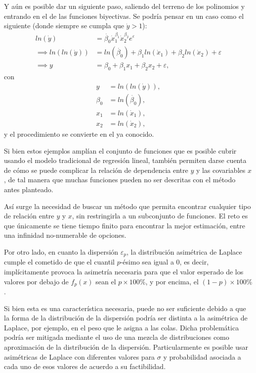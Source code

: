Y a\'un es posible dar un siguiente paso, saliendo del terreno de los polinomios y entrando en el de las funciones biyectivas. Se podr\'ia pensar en un caso como el siguiente (donde siempre se cumpla que $\dot{y} > 1$):
\begin{equation*}
\begin{aligned}
    ln(\dot{y}) &= \dot{\beta_0}\dot{x}_1^{\beta_1}\dot{x}_2^{\beta_2} e^{\varepsilon} \\
    \implies ln(ln(\dot{y})) &= ln(\dot{\beta_0}) + \beta_1 ln(\dot{x}_1) + \beta_2 ln(\dot{x}_2) + \varepsilon \\
    \implies y &= \beta_0 + \beta_1 x_1 + \beta_2 x_2 + \varepsilon, 
\end{aligned}
\end{equation*}
con
\begin{equation*}
\begin{aligned}
    y &= ln(ln(\dot{y})), \\
    \beta_0 &= ln(\dot{\beta_0}), \\
    x_1 &= ln(\dot{x}_1), \\
    x_2 &= ln(\dot{x}_2),
\end{aligned}
\end{equation*}
y el procedimiento se convierte en el ya conocido.

Si bien estos ejemplos ampl\'ian el conjunto de funciones que es posible cubrir usando el modelo tradicional de regresi\'on lineal, tambi\'en permiten darse cuenta de c\'omo se puede complicar la relaci\'on de dependencia entre $y$ y las covariables $x$, de tal manera que muchas funciones pueden no ser descritas con el m\'etodo antes planteado.

As\'i surge la necesidad de buscar un m\'etodo que permita encontrar cualquier tipo de relaci\'on entre $y$ y $x$, sin restringirla a un subconjunto de funciones. El reto es que \'unicamente se tiene tiempo finito para encontrar la mejor estimaci\'on, entre una infinidad no-numerable de opciones.

Por otro lado, en cuanto la dispersi\'on $\varepsilon_p$, la distribuci\'on asim\'etrica de Laplace cumple el cometido de que el cuantil $p$-\'esimo sea igual a 0, es decir, impl\'icitamente provoca la asimetr\'ia necesaria para que el valor esperado de los valores por debajo de $f_p(x)$ sean el $p \times 100\%$, y por encima, el $(1-p) \times 100\%$.

Si bien esta es una caracter\'istica necesaria, puede no ser suficiente debido a que la forma de la distribuci\'on de la dispersi\'on podr\'ia ser distinta a la asim\'etrica de Laplace, por ejemplo, en el peso que le asigna a las colas. Dicha problem\'atica podr\'ia ser mitigada mediante el uso de una mezcla de distribuciones como aproximaci\'on de la distribuci\'on de la dispersi\'on.  Particularmente es posible usar asim\'etricas de Laplace con diferentes valores para $\sigma$ y probabilidad asociada a cada uno de esos valores de acuerdo a su factibilidad. 

